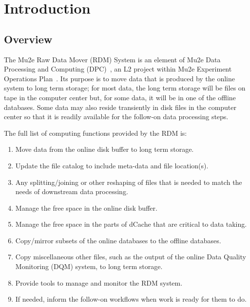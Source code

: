 \chapter{Introduction}
\label{ch:intro}

\section{Overview}
\label{sec:overview}

The Mu2e Raw Data Mover (RDM) System is an element of Mu2e Data Processing
and Computing (DPC)~\cite{DPC}, an L2 project within Mu2e Experiment Operations Plan~\cite{PEOP}.
Its purpose is to move data
that is produced by the online system to long term storage;
for most data, the long term storage will be files on tape in the computer center
but, for some data, it will be in one of the offline databases.
Some data may also reside transiently in disk files in the computer center so that
it is readily available for the follow-on data processing steps.

The full list of computing functions provided by the RDM is:
\begin{enumerate}
\item Move data from the online disk buffer to long term storage.
\item Update the file catalog to include meta-data and file location(s).
\item Any splitting/joining or other reshaping of files that is needed to match the needs of downstream data processing.
\item Manage the free space in the online disk buffer.
\item Manage the free space in the parts of dCache that are critical to data taking.
\item Copy/mirror subsets of the online databases to the offline databases.
\item Copy miscellaneous other files, such as the output of the online Data Quality Monitoring (DQM) system, to long term storage.
\item Provide tools to manage and monitor the RDM system.
\item If needed, inform the follow-on workflows when work is ready for them to do.
\end{enumerate}



